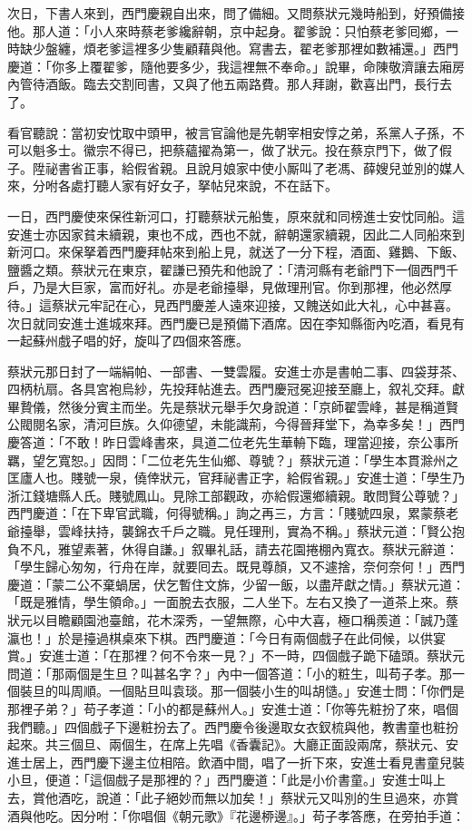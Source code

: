 次日，下書人來到，西門慶親自出來，問了備細。又問蔡狀元幾時船到，好預備接他。那人道：「小人來時蔡老爹纔辭朝，京中起身。翟爹說：只怕蔡老爹囘鄉，一時缺少盤纏，煩老爹這裡多少隻顧藉與他。寫書去，翟老爹那裡如數補還。」西門慶道：「你多上覆翟爹，隨他要多少，我這裡無不奉命。」說畢，命陳敬濟讓去廂房內管待酒飯。臨去交割囘書，又與了他五兩路費。那人拜謝，歡喜出門，長行去了。

看官聽說：當初安忱取中頭甲，被言官論他是先朝宰相安惇之弟，系黨人子孫，不可以魁多士。徽宗不得已，把蔡蘊擢為第一，做了狀元。投在蔡京門下，做了假子。陞祕書省正事，給假省親。且說月娘家中使小厮叫了老馮、薛嫂兒並別的媒人來，分咐各處打聽人家有好女子，拏帖兒來說，不在話下。

一日，西門慶使來保徃新河口，打聽蔡狀元船隻，原來就和同榜進士安忱同船。這安進士亦因家貧未續親，東也不成，西也不就，辭朝還家續親，因此二人同船來到新河口。來保拏着西門慶拜帖來到船上見，就送了一分下程，酒面、雞鵝、下飯、鹽醬之類。蔡狀元在東京，翟謙已預先和他說了：「清河縣有老爺門下一個西門千戶，乃是大巨家，富而好礼。亦是老爺擡舉，見做理刑官。你到那裡，他必然厚待。」這蔡狀元牢記在心，{}見西門慶差人遠來迎接，又餽送如此大礼，心中甚喜。次日就同安進士進城來拜。西門慶已是預備下酒席。因在李知縣衙內吃酒，看見有一起蘇州戲子唱的好，旋叫了四個來答應。

蔡狀元那日封了一端絹帕、一部書、一雙雲履。安進士亦是書帕二事、四袋芽茶、四柄杭扇。各具宮袍烏紗，先投拜帖進去。西門慶冠冕迎接至廳上，叙礼交拜。獻畢贄儀，然後分賓主而坐。先是蔡狀元舉手欠身說道：「京師翟雲峰，{}甚是稱道賢公閥閱名家，清河巨族。久仰德望，未能識荊，今得晉拜堂下，為幸多矣！」西門慶答道：「不敢！昨日雲峰書來，具道二位老先生華輈下臨，理當迎接，奈公事所羈，望乞寬恕。」因問：「二位老先生仙鄉、尊號？」蔡狀元道：「學生本貫滁州之匡廬人也。賤號一泉，僥倖狀元，官拜祕書正字，給假省親。」安進士道：「學生乃浙江錢塘縣人氏。賤號鳳山。見除工部觀政，亦給假還鄉續親。敢問賢公尊號？」西門慶道：「在下卑官武職，何得號稱。」詢之再三，方言：「賤號四泉，累蒙蔡老爺擡舉，雲峰扶持，襲錦衣千戶之職。見任理刑，實為不稱。」蔡狀元道：「賢公抱負不凡，雅望素著，休得自謙。」叙畢礼話，請去花園捲棚內寬衣。蔡狀元辭道：「學生歸心匆匆，行舟在岸，就要囘去。既見尊顏，又不遽捨，奈何奈何！」{}西門慶道：「蒙二公不棄蝸居，伏乞暫住文旆，少留一飯，以盡芹獻之情。」蔡狀元道：「既是雅情，學生領命。」一面脫去衣服，二人坐下。左右又換了一道茶上來。蔡狀元以目瞻顧園池臺館，花木深秀，一望無際，心中大喜，極口稱羨道：「誠乃蓬瀛也！」於是擡過棋桌來下棋。西門慶道：「今日有兩個戲子在此伺候，以供宴賞。」安進士道：「在那裡？何不令來一見？」不一時，四個戲子跪下磕頭。蔡狀元問道：「那兩個是生旦？叫甚名字？」內中一個答道：「小的粧生，叫苟子孝。那一個裝旦的叫周順。一個貼旦叫袁琰。那一個裝小生的叫胡慥。」安進士問：「你們是那裡子弟？」苟子孝道：「小的都是蘇州人。」安進士道：「你等先粧扮了來，唱個我們聽。」四個戲子下邊粧扮去了。西門慶令後邊取女衣釵梳與他，教書童也粧扮起來。共三個旦、兩個生，在席上先唱《香囊記》。大廳正面設兩席，蔡狀元、安進士居上，西門慶下邊主位相陪。飲酒中間，唱了一折下來，安進士看見書童兒裝小旦，便道：「這個戲子是那裡的？」西門慶道：「此是小价書童。」安進士叫上去，賞他酒吃，說道：「此子絕妙而無以加矣！」蔡狀元又叫別的生旦過來，亦賞酒與他吃。因分咐：「你唱個《朝元歌》『花邊桺邊』。」苟子孝答應，在旁拍手道：

